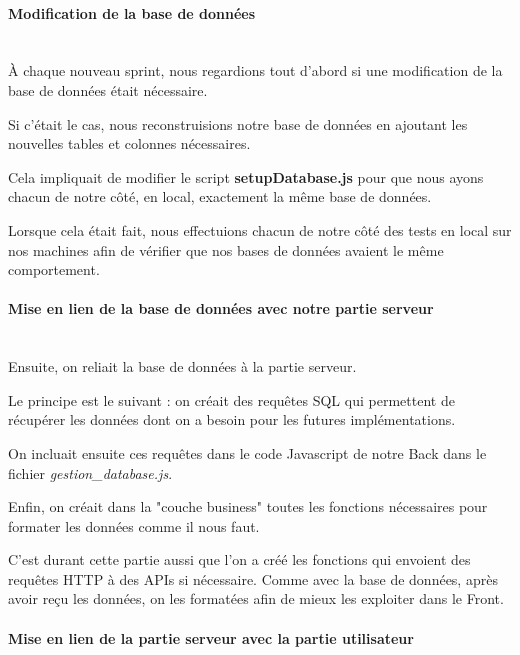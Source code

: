 \documentclass[12pt,french]{article}
\begin{document}
\paragraph{Modification de la base de données \\\\}

À chaque nouveau \gls{sprint}, nous regardions tout d'abord si une modification de la base de données était nécessaire.

Si c'était le cas, nous reconstruisions notre base de données en ajoutant les nouvelles tables et colonnes nécessaires.

Cela impliquait de modifier le script \textbf{setupDatabase.js} pour que nous ayons chacun de notre côté, en local, exactement la même base de données.

Lorsque cela était fait, nous effectuions chacun de notre côté des tests en local sur nos machines afin de vérifier que nos bases de données avaient le même comportement.

\paragraph{Mise en lien de la base de données avec notre partie serveur \\\\}

Ensuite, on reliait la base de données à la partie serveur.

\medskip

Le principe est le suivant : on créait des requêtes \gls{SQL} qui permettent de récupérer les données dont on a besoin pour les futures implémentations.

On incluait ensuite ces requêtes dans le code \gls{Javascript} de notre \gls{Back} dans le fichier \textit{gestion\_database.js}.

Enfin, on créait dans la "couche business" toutes les fonctions nécessaires pour formater les données comme il nous faut.

C'est durant cette partie aussi que l'on a créé les fonctions qui envoient des requêtes \gls{HTTP} à des \gls{API}s si nécessaire. Comme avec la base de données, après avoir reçu les données, on les formatées afin de mieux les exploiter dans le \gls{Front}.

\paragraph{Mise en lien de la partie serveur avec la partie utilisateur \\\\}
\end{document}
